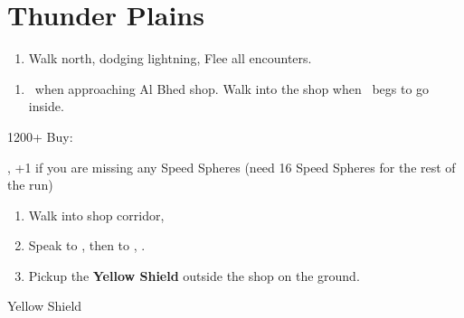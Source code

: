 \chapter{Thunder Plains}

\begin{enumerate}
    \item Walk north, dodging lightning, Flee all encounters.
\end{enumerate}
\begin{enumerate}[resume]
    \item \sd\ when approaching Al Bhed shop. Walk into the shop when \rikku\ begs to go inside.
\end{enumerate}
\begin{shop}{1200+}
    Buy:
    \begin{itemize}
        , +1 if you are missing any Speed Spheres (need 16 Speed Spheres for the rest of the run)
    \end{itemize}
\end{shop}
\begin{enumerate}[resume]
    \item Walk into shop corridor, \cs[2:00]
    \item Speak to \auron, then to \rikku, \sd.
    \item Pickup the \textbf{Yellow Shield} outside the shop on the ground.
\end{enumerate}
\begin{equip}
    \begin{itemize}
        \tidusf Yellow Shield
    \end{itemize}
\end{equip}
